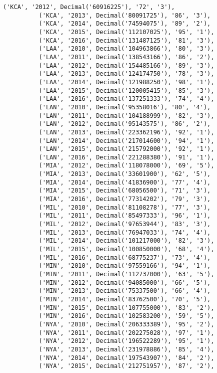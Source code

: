 \documentclass[11pt]{article}
\begin{document}
\begin{Verbatim}[commandchars=\\\{\}]
          ('KCA', '2012', Decimal('60916225'), '72', '3'),
          ('KCA', '2013', Decimal('80091725'), '86', '3'),
          ('KCA', '2014', Decimal('74594075'), '89', '2'),
          ('KCA', '2015', Decimal('112107025'), '95', '1'),
          ('KCA', '2016', Decimal('131487125'), '81', '3'),
          ('LAA', '2010', Decimal('104963866'), '80', '3'),
          ('LAA', '2011', Decimal('138543166'), '86', '2'),
          ('LAA', '2012', Decimal('154485166'), '89', '3'),
          ('LAA', '2013', Decimal('124174750'), '78', '3'),
          ('LAA', '2014', Decimal('121988250'), '98', '1'),
          ('LAA', '2015', Decimal('120005415'), '85', '3'),
          ('LAA', '2016', Decimal('137251333'), '74', '4'),
          ('LAN', '2010', Decimal('95358016'), '80', '4'),
          ('LAN', '2011', Decimal('104188999'), '82', '3'),
          ('LAN', '2012', Decimal('95143575'), '86', '2'),
          ('LAN', '2013', Decimal('223362196'), '92', '1'),
          ('LAN', '2014', Decimal('217014600'), '94', '1'),
          ('LAN', '2015', Decimal('215792000'), '92', '1'),
          ('LAN', '2016', Decimal('221288380'), '91', '1'),
          ('MIA', '2012', Decimal('118078000'), '69', '5'),
          ('MIA', '2013', Decimal('33601900'), '62', '5'),
          ('MIA', '2014', Decimal('41836900'), '77', '4'),
          ('MIA', '2015', Decimal('68056500'), '71', '3'),
          ('MIA', '2016', Decimal('77314202'), '79', '3'),
          ('MIL', '2010', Decimal('81108278'), '77', '3'),
          ('MIL', '2011', Decimal('85497333'), '96', '1'),
          ('MIL', '2012', Decimal('97653944'), '83', '3'),
          ('MIL', '2013', Decimal('76947033'), '74', '4'),
          ('MIL', '2014', Decimal('101217000'), '82', '3'),
          ('MIL', '2015', Decimal('100850000'), '68', '4'),
          ('MIL', '2016', Decimal('68775237'), '73', '4'),
          ('MIN', '2010', Decimal('97559166'), '94', '1'),
          ('MIN', '2011', Decimal('112737000'), '63', '5'),
          ('MIN', '2012', Decimal('94085000'), '66', '5'),
          ('MIN', '2013', Decimal('75337500'), '66', '4'),
          ('MIN', '2014', Decimal('83762500'), '70', '5'),
          ('MIN', '2015', Decimal('107755000'), '83', '2'),
          ('MIN', '2016', Decimal('102583200'), '59', '5'),
          ('NYA', '2010', Decimal('206333389'), '95', '2'),
          ('NYA', '2011', Decimal('202275028'), '97', '1'),
          ('NYA', '2012', Decimal('196522289'), '95', '1'),
          ('NYA', '2013', Decimal('231978886'), '85', '4'),
          ('NYA', '2014', Decimal('197543907'), '84', '2'),
          ('NYA', '2015', Decimal('212751957'), '87', '2'),

\end{Verbatim}
\end{document}
